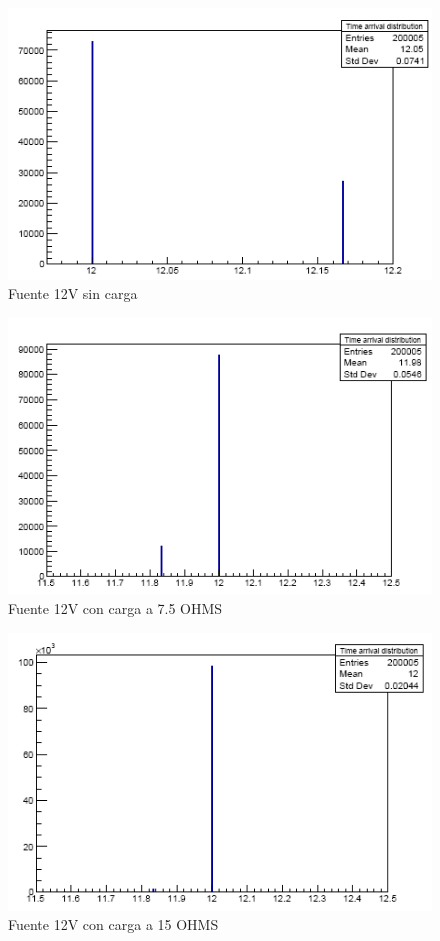 \begin{figure}[H]
\centering
\includegraphics[width=12cm]{Capitulo3/figs/sincarga.png}
\caption{Fuente 12V sin carga}
\end{figure}

\begin{figure}[H]
\centering
\includegraphics[width=12cm]{Capitulo3/figs/75ohms.png}
\caption{Fuente 12V con carga a 7.5 OHMS}
\end{figure}

\begin{figure}[H]
\centering
\includegraphics[width=12cm]{Capitulo3/figs/15ohms.png}
\caption{Fuente 12V con carga a 15 OHMS}
\end{figure}

